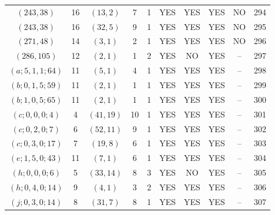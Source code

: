 \begin{longtable}{|c|c|c|c|c|c|c|c|c|c|}
$(243, 38)$ & 16 & $(13, 2)$ & 7 & 1 & YES & YES & YES & NO & 294\\
$(243, 38)$ & 16 & $(32, 5)$ & 9 & 1 & YES & YES & YES & NO & 295\\
$(271, 48)$ & 14 & $(3, 1)$ & 2 & 1 & YES & YES & YES & NO & 296\\
$(286, 105)$ & 12 & $(2, 1)$ & 1 & 2 & YES & NO & YES & -- & 297\\
$(a; 5, 1, 1; 64)$ & 11 & $(5, 1)$ & 4 & 1 & YES & YES & YES & -- & 298\\
$(b; 0, 1, 5; 59)$ & 11 & $(2, 1)$ & 1 & 1 & YES & YES & YES & -- & 299\\
$(b; 1, 0, 5; 65)$ & 11 & $(2, 1)$ & 1 & 1 & YES & YES & YES & -- & 300\\
$(c; 0, 0, 0; 4)$ & 4 & $(41, 19)$ & 10 & 1 & YES & YES & YES & -- & 301\\
$(c; 0, 2, 0; 7)$ & 6 & $(52, 11)$ & 9 & 1 & YES & YES & YES & -- & 302\\
$(c; 0, 3, 0; 17)$ & 7 & $(19, 8)$ & 6 & 1 & YES & YES & YES & -- & 303\\
$(e; 1, 5, 0; 43)$ & 11 & $(7, 1)$ & 6 & 1 & YES & YES & YES & -- & 304\\
$(h; 0, 0, 0; 6)$ & 5 & $(33, 14)$ & 8 & 3 & YES & NO & YES & -- & 305\\
$(h; 0, 4, 0; 14)$ & 9 & $(4, 1)$ & 3 & 2 & YES & YES & YES & -- & 306\\
$(j; 0, 3, 0; 14)$ & 8 & $(31, 7)$ & 8 & 1 & YES & YES & YES & -- & 307
\end{longtable}

